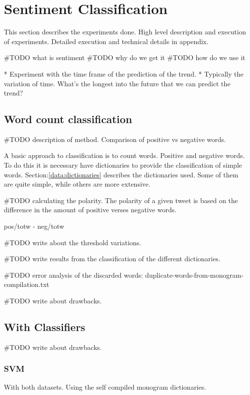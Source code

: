 
\chapter{Sentiment Classification}
This section describes the experiments done. High level description and
execution of experiments. Detailed execution and technical details in appendix. 

#TODO what is sentiment
#TODO why do we get it
#TODO how do we use it 


* Experiment with the time frame of the prediction of the trend. 
	* Typically the variation of time. What's the longest into the future that
we can predict the trend?

\section{Word count classification}
#TODO description of method. 
Comparison of positive vs negative words.

A basic approach to classification is to count words. Positive and negative
words. To do this it is necessary have dictionaries to provide the
classification of simple words. Section:\ref{data:dictionaries} describes the
dictionaries used. Some of them are quite simple, while others are more
extensive. 

#TODO calculating the polarity.  
The polarity of a given tweet is based on the difference in the amount of
positive verses negative words.

pos/totw - neg/totw 

#TODO write about the threshold variations.  

#TODO write results from the classification of the different dictionaries.

#TODO error analysis of the discarded words:
duplicate-words-from-monogram-compilation.txt

#TODO write about drawbacks. 

\section{With Classifiers}

#TODO write about drawbacks. 

\subsection{SVM}
With both datasets.
Using the self compiled monogram dictionaries. 

